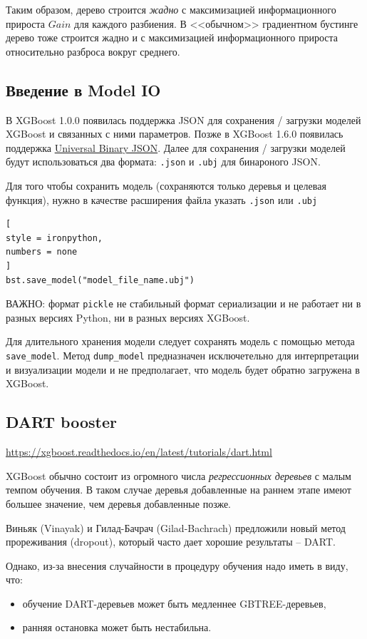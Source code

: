 \documentclass[%
	11pt,
	a4paper,
	utf8,
		]{article}
\begin{document}
Таким образом, дерево строится \emph{жадно} с максимизацией информационного прироста $ Gain $ для каждого разбиения. В <<обычном>> градиентном бустинге дерево тоже строится жадно и с максимизацией информационного прироста относительно разброса вокруг среднего.

\subsection{Введение в Model IO}

В XGBoost 1.0.0 появилась поддержка JSON для сохранения / загрузки моделей XGBoost и связанных с ними параметров. Позже в XGBoost 1.6.0 появилась поддержка \href{https://ubjson.org/}{Universal Binary JSON}. Далее для сохранения / загрузки моделей будут использоваться два формата: \verb|.json| и \verb|.ubj| для бинароного JSON.

Для того чтобы сохранить модель (сохраняются только деревья и целевая функция), нужно в качестве расширения файла указать \verb|.json| или \verb|.ubj|
\begin{lstlisting}[
style = ironpython,
numbers = none
]
bst.save_model("model_file_name.ubj")
\end{lstlisting}

ВАЖНО: формат \verb|pickle| не стабильный формат сериализации и не работает ни в разных версиях Python, ни в разных версиях XGBoost.

Для длительного хранения модели следует сохранять модель с помощью метода \verb|save_model|. Метод \verb|dump_model| предназначен исключетельно для интерпретации и визуализации модели и не предполагает, что модель будет обратно загружена в XGBoost.

\subsection{DART booster}

\url{https://xgboost.readthedocs.io/en/latest/tutorials/dart.html}

XGBoost обычно состоит из огромного числа \emph{регрессионных деревьев} с малым темпом обучения. В таком случае деревья добавленные на раннем этапе имеют большее значение, чем деревья добавленные позже.

 Виньяк (Vinayak) и Гилад-Бачрач (Gilad-Bachrach) \cite{dart:2015} предложили новый метод прореживания (dropout), который часто дает хорошие результаты -- DART.
 
 Однако, из-за внесения случайности в процедуру обучения надо иметь в виду, что:
 \begin{itemize}
 	\item  обучение DART-деревьев может быть медленнее GBTREE-деревьев,
 	
 	\item ранняя остановка может быть нестабильна.
 \end{itemize}
\end{document}
